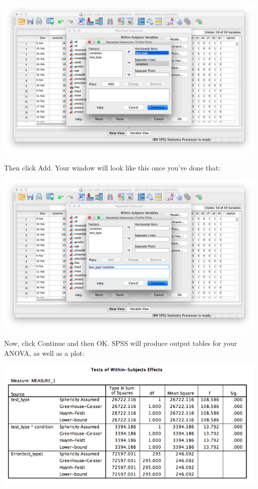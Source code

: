 \documentclass[
]{book}
\begin{document}
\includegraphics{img/11.4.15.png}

Then click {Add}. Your window will look like this once you've done that:

\includegraphics{img/11.4.16.png}

Now, click {Continue} and then {OK}. SPSS will produce output tables for your ANOVA, as well as a plot:

\includegraphics{img/11.4.17.png}
\end{document}
